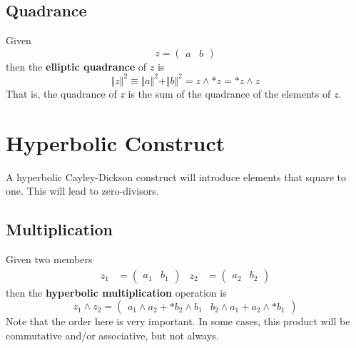 \subsection{Quadrance}
Given
\begin{equation}
    z = \begin{pmatrix}
        a & b
    \end{pmatrix}
\end{equation}
then the \textbf{elliptic quadrance} of $z$ is
\begin{equation}
    \Vert z \Vert^{2} \equiv \Vert a \Vert^{2} + \Vert b \Vert^{2} = z \wedge {\ast z} = {\ast z} \wedge z
\end{equation}
That is, the quadrance of $z$ is the sum of the quadrance of the elements of $z$.
\section{Hyperbolic Construct}
A hyperbolic Cayley-Dickson construct will introduce elements that square to one. This will lead to zero-divisors.
\subsection{Multiplication}
Given two members
\begin{align*}
    z_{1} &= \begin{pmatrix}
        a_{1} & b_{1}
    \end{pmatrix} &
    z_{2} &= \begin{pmatrix}
        a_{2} & b_{2}
    \end{pmatrix}
\end{align*}
then the \textbf{hyperbolic multiplication} operation is
\begin{equation}
    z_{1} \wedge z_{2} = \begin{pmatrix}
        a_{1} \wedge a_{2} + {\ast b_{2}} \wedge b_{1} & b_{2} \wedge a_{1} + a_{2} \wedge {\ast b_{1}}
    \end{pmatrix}
\end{equation}
Note that the order here is very important. In some cases, this product will be commutative and/or associative, but not always.
